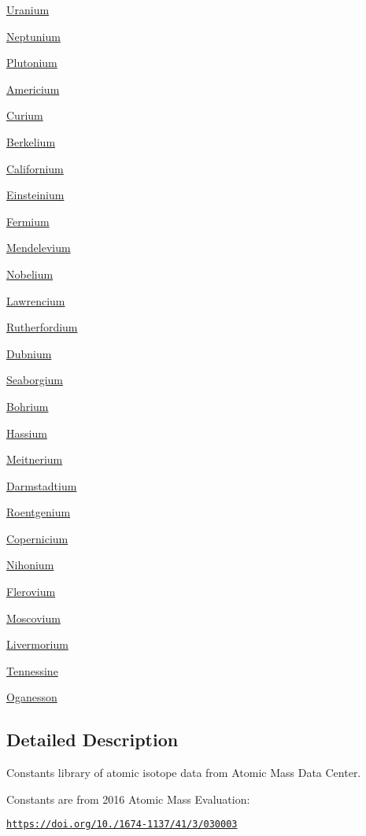 \begin{DoxyCompactItemize}
\item 
\mbox{\hyperlink{group___isotope_const-_uranium}{Uranium}}
\item 
\mbox{\hyperlink{group___isotope_const-_neptunium}{Neptunium}}
\item 
\mbox{\hyperlink{group___isotope_const-_plutonium}{Plutonium}}
\item 
\mbox{\hyperlink{group___isotope_const-_americium}{Americium}}
\item 
\mbox{\hyperlink{group___isotope_const-_curium}{Curium}}
\item 
\mbox{\hyperlink{group___isotope_const-_berkelium}{Berkelium}}
\item 
\mbox{\hyperlink{group___isotope_const-_californium}{Californium}}
\item 
\mbox{\hyperlink{group___isotope_const-_einsteinium}{Einsteinium}}
\item 
\mbox{\hyperlink{group___isotope_const-_fermium}{Fermium}}
\item 
\mbox{\hyperlink{group___isotope_const-_mendelevium}{Mendelevium}}
\item 
\mbox{\hyperlink{group___isotope_const-_nobelium}{Nobelium}}
\item 
\mbox{\hyperlink{group___isotope_const-_lawrencium}{Lawrencium}}
\item 
\mbox{\hyperlink{group___isotope_const-_rutherfordium}{Rutherfordium}}
\item 
\mbox{\hyperlink{group___isotope_const-_dubnium}{Dubnium}}
\item 
\mbox{\hyperlink{group___isotope_const-_seaborgium}{Seaborgium}}
\item 
\mbox{\hyperlink{group___isotope_const-_bohrium}{Bohrium}}
\item 
\mbox{\hyperlink{group___isotope_const-_hassium}{Hassium}}
\item 
\mbox{\hyperlink{group___isotope_const-_meitnerium}{Meitnerium}}
\item 
\mbox{\hyperlink{group___isotope_const-_darmstadtium}{Darmstadtium}}
\item 
\mbox{\hyperlink{group___isotope_const-_roentgenium}{Roentgenium}}
\item 
\mbox{\hyperlink{group___isotope_const-_copernicium}{Copernicium}}
\item 
\mbox{\hyperlink{group___isotope_const-_nihonium}{Nihonium}}
\item 
\mbox{\hyperlink{group___isotope_const-_flerovium}{Flerovium}}
\item 
\mbox{\hyperlink{group___isotope_const-_moscovium}{Moscovium}}
\item 
\mbox{\hyperlink{group___isotope_const-_livermorium}{Livermorium}}
\item 
\mbox{\hyperlink{group___isotope_const-_tennessine}{Tennessine}}
\item 
\mbox{\hyperlink{group___isotope_const-_oganesson}{Oganesson}}
\end{DoxyCompactItemize}


\subsection{Detailed Description}
Constants library of atomic isotope data from Atomic Mass Data Center. 

Constants are from 2016 Atomic Mass Evaluation\+:

\href{https://doi.org/10.1088/1674-1137/41/3/030003}{\tt https\+://doi.\+org/10./1674-\/1137/41/3/030003} 